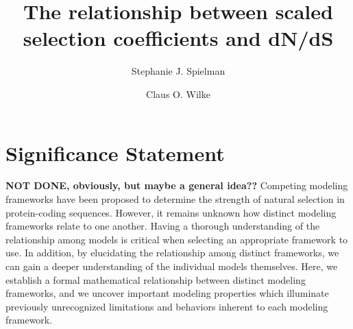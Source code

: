 \documentclass[11pt]{article}
\begin{document}
	
	
\title{The relationship between scaled selection coefficients and dN/dS}
	
\author{Stephanie J. Spielman 
	\and
	Claus O. Wilke
}
	

		
\section*{Significance Statement} 
\textbf{NOT DONE, obviously, but maybe a general idea??} Competing modeling frameworks have been proposed to determine the strength of natural selection in protein-coding sequences. However, it remains unknown how distinct modeling frameworks relate to one another. Having a thorough understanding of the relationship among models is critical when selecting an appropriate framework to use. In addition, by elucidating the relationship among distinct frameworks, we can gain a deeper understanding of the individual models themselves. Here, we establish a formal mathematical relationship between distinct modeling frameworks, and we uncover important modeling properties which illuminate previously unrecognized limitations and behaviors inherent to each modeling framework.
\end{document}
